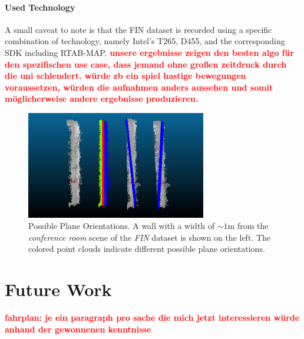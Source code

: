 \documentclass[main.tex]{subfiles}
\begin{document}
\paragraph{Used Technology}
A small caveat to note is that the FIN dataset is recorded using a specific combination of technology, namely Intel's T265, D455, and the corresponding SDK including RTAB-MAP.
\textbf{\textcolor{red}{unsere ergebnisse zeigen den besten algo für den spezifischen use case, dass jemand ohne großen zeitdruck durch die uni schlendert. würde zb ein spiel hastige bewegungen voraussetzen, würden die aufnahmen anders aussehen und somit möglicherweise andere ergebnisse produzieren.}}

\begin{figure}
    \centering
    \includegraphics[width=0.7\textwidth]{images/possible_planes.png}
    \caption[Plane Orientation Ambiguity]{Possible Plane Orientations. A wall with a width of ${\sim}1$m from the \textit{conference room} scene of the \textit{FIN} dataset is shown on the left. The colored point clouds indicate different possible plane orientations.}
    \label{fig:poss-planes}
\end{figure}

\section{Future Work}
\textbf{\textcolor{red}{fahrplan: je ein paragraph pro sache die mich jetzt interessieren würde anhand der gewonnenen kenntnisse}}
\end{document}
